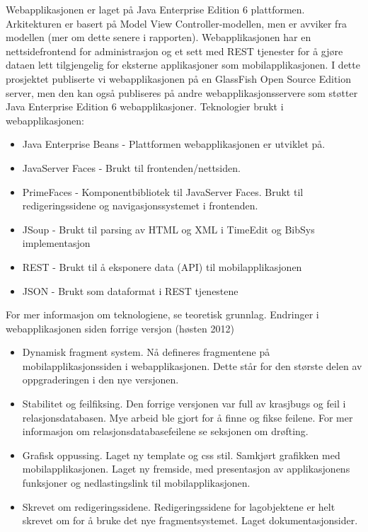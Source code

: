 \documentclass[../main.tex]{subfiles}
\begin{document}
Webapplikasjonen er laget på Java Enterprise Edition 6 plattformen. Arkitekturen er basert på Model View Controller-modellen, men er avviker fra modellen (mer om dette senere i rapporten). Webapplikasjonen har en nettsidefrontend for administrasjon og et sett med REST tjenester for å gjøre dataen lett tilgjengelig for eksterne applikasjoner som mobilapplikasjonen. I dette prosjektet publiserte vi webapplikasjonen på en GlassFish Open Source Edition server, men den kan også publiseres på andre webapplikasjonsservere som støtter Java Enterprise Edition 6 webapplikasjoner. \newline
\newline
Teknologier brukt i webapplikasjonen:
\begin{itemize}
\item Java Enterprise Beans - Plattformen webapplikasjonen er utviklet på.
\item JavaServer Faces - Brukt til frontenden/nettsiden.
\item PrimeFaces - Komponentbibliotek til JavaServer Faces. Brukt til redigeringssidene og navigasjonssystemet i frontenden.
\item JSoup - Brukt til parsing av HTML og XML i TimeEdit og BibSys implementasjon
\item REST - Brukt til å eksponere data (API) til mobilapplikasjonen
\item JSON - Brukt som dataformat i REST tjenestene
\end{itemize}
For mer informasjon om teknologiene, se teoretisk grunnlag.\newline
\newline
Endringer i webapplikasjonen siden forrige versjon (høsten 2012)
\begin{itemize}
\item Dynamisk fragment system. Nå defineres fragmentene på mobilapplikasjonssiden i webapplikasjonen. Dette står for den største delen av oppgraderingen i den nye versjonen.
\item Stabilitet og feilfiksing. Den forrige versjonen var full av krasjbugs og feil i relasjonsdatabasen. Mye arbeid ble gjort for å finne og fikse feilene. For mer informasjon om relasjonsdatabasefeilene se seksjonen om drøfting.
\item Grafisk oppussing. Laget ny template og css stil. Samkjørt grafikken med mobilapplikasjonen. Laget ny fremside, med presentasjon av applikasjonens funksjoner og nedlastingslink til mobilapplikasjonen.
\item Skrevet om redigeringssidene. Redigeringssidene for lagobjektene er helt skrevet om for å bruke det nye fragmentsystemet.
Laget dokumentasjonsider.
\end{itemize}
\end{document}
